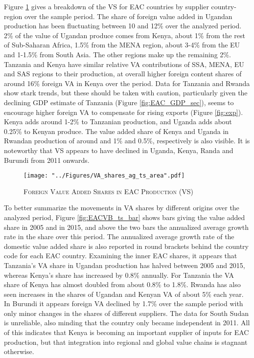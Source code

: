 \documentclass[a4paper]{article}
\begin{document}
Figure \ref{fig:EACVB_ts} gives a breakdown of the VS for EAC countries by supplier country-region over the sample period. The share of foreign value added in Ugandan production has been fluctuating between 10 and 12\% over the analyzed period. 2\% of the value of Ugandan produce comes from Kenya, about 1\% from the rest of Sub-Saharan Africa, 1.5\% from the MENA region, about 3-4\% from the EU and 1-1.5\% from South Asia. The other regions make up the remaining 2\%. Tanzania and Kenya have similar relative VA contributions of SSA, MENA, EU and SAS regions to their production, at overall higher foreign content shares of around 16\% foreign VA in Kenya over the period. Data for Tanzania and Rwanda show stark trends, but these should be taken with caution, particularly given the declining GDP estimate of Tanzania (Figure \ref{fig:EAC_GDP_sec}), seems to encourage higher foreign VA to compensate for rising exports (Figure \ref{fig:exp}). Kenya adds around 1-2\% to Tanzanian production, and Uganda adds about 0.25\% to Kenyan produce. The value added share of Kenya and Uganda in Rwandan production of around and 1\% and 0.5\%, respectively is also visible. It is noteworthy that VS appears to have declined in Uganda, Kenya, Randa and Burundi from 2011 onwards. %

\begin{figure}[h!]
\centering
\caption{\label{fig:EACVB_ts}\textsc{Foreign Value Added Shares in EAC Production (VS)}}
\texttt{[image: "../Figures/VA\_shares\_ag\_ts\_area".pdf]} %
\end{figure}
\FloatBarrier

To better summarize the movements in VA shares by different origins over the analyzed period, Figure \ref{fig:EACVB_ts_bar} shows  bars giving the value added share in 2005 and in 2015, and above the two bars the annualized average growth rate in the share over this period. The annualized average growth rate of the domestic value added share is also reported in round brackets behind the country code for each EAC country. %
Examining the inner EAC shares, it appears that Tanzania's VA share in Ugandan production has halved between 2005 and 2015, whereas Kenya's share has increased by 0.8\% annually. For Tanzania the VA share of Kenya has almost doubled from about 0.8\% to 1.8\%. Rwanda has also seen increases in the shares of Ugandan and Kenyan VA of about 5\% each year. In Burundi it appears foreign VA declined by 1.7\% over the sample period with only minor changes in the shares of different suppliers. The data for South Sudan is unreliable, also minding that the country only became independent in 2011. All of this indicates that Kenya is becoming an important supplier of inputs for EAC production, but that integration into regional and global value chains is stagnant otherwise. 
\end{document}
